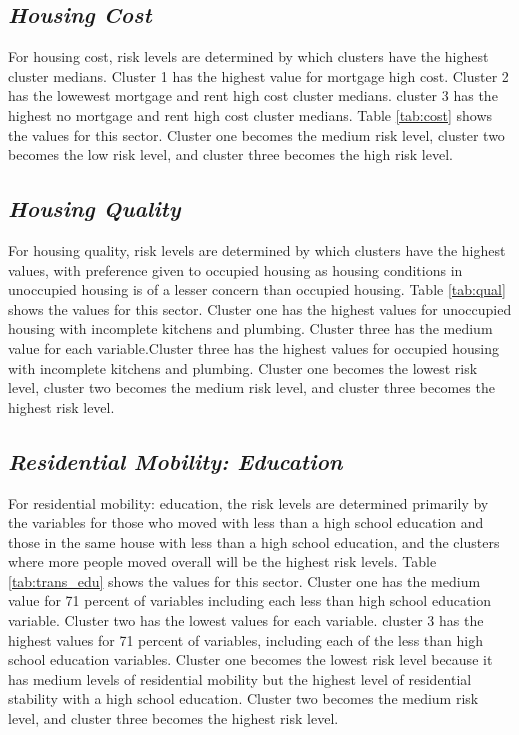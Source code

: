 

\subsection{\textit{Housing Cost}}

For housing cost, risk levels are determined by which clusters have the highest cluster medians. Cluster 1 has the highest value for mortgage high cost. Cluster 2 has the lowewest mortgage and rent high cost cluster medians. cluster 3 has the highest no mortgage and rent high cost cluster medians. Table \ref{tab:cost} shows the values for this sector. Cluster one becomes the medium risk level, cluster two becomes the low risk level, and cluster three becomes the high risk level. 



\subsection{\textit{Housing Quality}}

For housing quality, risk levels are determined by which clusters have the highest values, with preference given to occupied housing as housing conditions in unoccupied housing is of a lesser concern than occupied housing. Table \ref{tab:qual} shows the values for this sector. Cluster one has the highest values for unoccupied housing with incomplete kitchens and plumbing. Cluster three has the medium value for each variable.Cluster three has the highest values for occupied housing with incomplete kitchens and plumbing. Cluster one becomes the lowest risk level, cluster two becomes the medium risk level, and cluster three becomes the highest risk level. 





\subsection{\textit{Residential Mobility: Education}}
For residential mobility: education, the risk levels are determined primarily by the variables for those who moved with less than a high school education and those in the same house with less than a high school education, and the clusters where more people moved overall will be the highest risk levels. Table \ref{tab:trans_edu} shows the values for this sector. Cluster one has the medium value for 71 percent of variables including each less than high school education variable. Cluster two has the lowest values for each variable. cluster 3 has the highest values for 71 percent of variables, including each of the less than high school education variables. Cluster one becomes the lowest risk level because it has medium levels of residential mobility but the highest level of residential stability with a high school education. Cluster two becomes the medium risk level, and cluster three becomes the highest risk level. 

